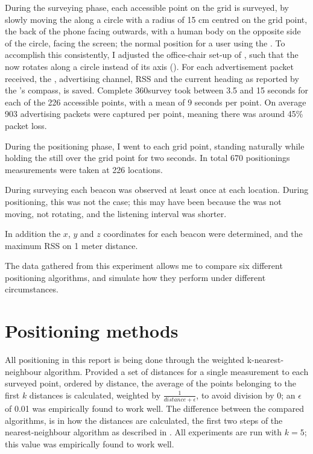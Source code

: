 During the surveying phase, each accessible point on the grid is surveyed, by slowly moving the \device along a circle with a radius of 15 cm centred on the grid point, the back of the phone facing outwards, with a human body on the opposite side of the circle, facing the screen; the normal position for a user using the \device.
To accomplish this consistently, I adjusted the office-chair set-up of , such that the \device now rotates along a circle instead of its axis ().
For each advertisement packet received, the \bid, advertising channel, RSS and the current heading as reported by the \device's compass, is saved.
Complete 360\tdegree survey took between 3.5 and 15 seconds for each of the 226 accessible points, with a mean of 9 seconds per point.
On average 903 advertising packets were captured per point, meaning there was around 45\% packet loss.

During the positioning phase, I went to each grid point, standing naturally while holding the \device still over the grid point for two seconds.
In total 670 positionings measurements were taken at 226 locations.

During surveying each beacon was observed at least once at each location.
During positioning, this was not the case; this may have been because the \device was not moving, not rotating, and the listening interval was shorter.

In addition the $x$, $y$ and $z$ coordinates for each beacon were determined, and the maximum RSS on 1 meter distance.

The data gathered from this experiment allows me to compare six different positioning algorithms, and simulate how they perform under different circumstances.

\section{Positioning methods}

All positioning in this report is being done through the weighted k-nearest-neighbour algorithm.
Provided a set of distances for a single measurement to each surveyed point, ordered by distance, the average of the points belonging to the first $k$ distances is calculated, weighted by $\frac{1}{distance+\epsilon}$, to avoid division by 0; an $\epsilon$ of 0.01 was empirically found to work well.
The difference between the compared algorithms, is in how the distances are calculated, the first two steps of the nearest-neighbour algorithm as described in .
All experiments are run with $k = 5$; this value was empirically found to work well.

